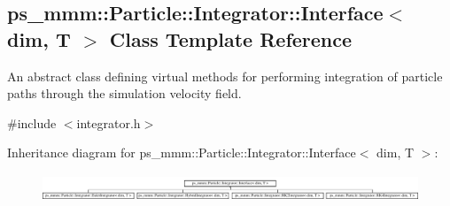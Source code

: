 \hypertarget{classps__mmm_1_1_particle_1_1_integrator_1_1_interface}{}\subsection{ps\+\_\+mmm\+:\+:Particle\+:\+:Integrator\+:\+:Interface$<$ dim, T $>$ Class Template Reference}
\label{classps__mmm_1_1_particle_1_1_integrator_1_1_interface}


An abstract class defining virtual methods for performing integration of particle paths through the simulation velocity field.  




{\ttfamily \#include $<$integrator.\+h$>$}

Inheritance diagram for ps\+\_\+mmm\+:\+:Particle\+:\+:Integrator\+:\+:Interface$<$ dim, T $>$\+:\begin{figure}[H]
\begin{center}
\leavevmode
\includegraphics[height=0.840841cm]{classps__mmm_1_1_particle_1_1_integrator_1_1_interface}
\end{center}
\end{figure}
